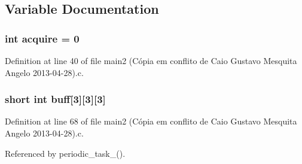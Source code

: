 \subsection{Variable Documentation}
\hypertarget{main2_01_07C_xC3_xB3pia_01em_01conflito_01de_01Caio_01Gustavo_01Mesquita_01Angelo_012013-04-28_08_8c_a95a859aa805a58cd4c59e172d250de4a}{
\subsubsection[{acquire}]{\setlength{\rightskip}{0pt plus 5cm}int acquire = 0}}\label{main2_01_07C_xC3_xB3pia_01em_01conflito_01de_01Caio_01Gustavo_01Mesquita_01Angelo_012013-04-28_08_8c_a95a859aa805a58cd4c59e172d250de4a}


Definition at line 40 of file main2 (\-Cópia em conflito de Caio Gustavo Mesquita Angelo 2013-\/04-\/28).\-c.

\hypertarget{main2_01_07C_xC3_xB3pia_01em_01conflito_01de_01Caio_01Gustavo_01Mesquita_01Angelo_012013-04-28_08_8c_aaa9d39905d1be632c8232f11155291d0}{
\subsubsection[{buff}]{\setlength{\rightskip}{0pt plus 5cm}short int buff\mbox{[}3\mbox{]}\mbox{[}3\mbox{]}\mbox{[}3\mbox{]}}}\label{main2_01_07C_xC3_xB3pia_01em_01conflito_01de_01Caio_01Gustavo_01Mesquita_01Angelo_012013-04-28_08_8c_aaa9d39905d1be632c8232f11155291d0}


Definition at line 68 of file main2 (\-Cópia em conflito de Caio Gustavo Mesquita Angelo 2013-\/04-\/28).\-c.



Referenced by periodic\-\_\-task\-\_().


